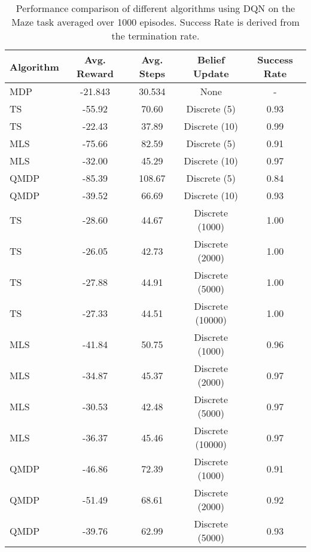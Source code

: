 \begin{table}[h]
    \centering
    \begin{tabular}{lcccc}
    \toprule
    \textbf{Algorithm} & \textbf{Avg. Reward} & \textbf{Avg. Steps} & \textbf{Belief Update} & \textbf{Success Rate}\\
    \midrule
    MDP & -21.843 & 30.534 & None & - \\
    \midrule
    TS & -55.92 & 70.60 & Discrete (5) & 0.93 \\
    TS & -22.43 & 37.89 & Discrete (10) & 0.99 \\
    MLS & -75.66 & 82.59 & Discrete (5) & 0.91 \\
    MLS & -32.00 & 45.29 & Discrete (10) & 0.97 \\
    QMDP & -85.39 & 108.67 & Discrete (5) & 0.84 \\
    QMDP & -39.52 & 66.69 & Discrete (10) & 0.93 \\
    TS & -28.60 & 44.67 & Discrete (1000) & 1.00 \\
    TS & -26.05 & 42.73 & Discrete (2000) & 1.00 \\
    TS & -27.88 & 44.91 & Discrete (5000) & 1.00 \\
    TS & -27.33 & 44.51 & Discrete (10000) & 1.00 \\
    MLS & -41.84 & 50.75 & Discrete (1000) & 0.96 \\
    MLS & -34.87 & 45.37 & Discrete (2000) & 0.97 \\
    MLS & -30.53 & 42.48 & Discrete (5000) & 0.97 \\
    MLS & -36.37 & 45.46 & Discrete (10000) & 0.97 \\
    QMDP & -46.86 & 72.39 & Discrete (1000) & 0.91 \\
    QMDP & -51.49 & 68.61 & Discrete (2000) & 0.92 \\
    QMDP & -39.76 & 62.99 & Discrete (5000) & 0.93 \\
    \midrule
    \bottomrule
    \end{tabular}
    \caption{Performance comparison of different algorithms using DQN on the Maze task averaged over 1000 episodes. Success Rate is derived from the termination rate.}
    \label{tab:maze_results_dqn}
\end{table}